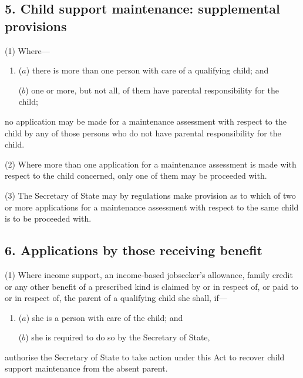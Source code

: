 \documentclass[12pt,a4paper]{article}
\begin{document}
\subsection{5. Child support maintenance: supplemental provisions}

(1) Where—
\begin{enumerate}\item[]
($a$) there is more than one person with care of a qualifying child; and

($b$) one or more, but not all, of them have parental responsibility for 
the child;
\end{enumerate}
no application may be made for a maintenance assessment with respect to the child by any of those persons who do not have parental responsibility for 
the child.

(2) Where more than one application for a maintenance assessment is made with respect to the child concerned, only one of them may be proceeded with.

(3) The Secretary of State may by regulations make provision as to which of two or more applications for a maintenance assessment with respect to the same child is to be proceeded with.


\subsection{6. Applications by those receiving benefit}

(1) Where income support, 
an income-based jobseeker’s allowance,  %
family credit or any other benefit of a prescribed kind is claimed by or in respect of, or paid to or in respect of, the parent of a qualifying child she shall, if—
\begin{enumerate}\item[]
($a$) she is a person with care of the child; and

($b$) she is required to do so by the Secretary of State,
\end{enumerate}
authorise the Secretary of State to take action under this Act to recover child support maintenance from the absent parent.
\end{document}
